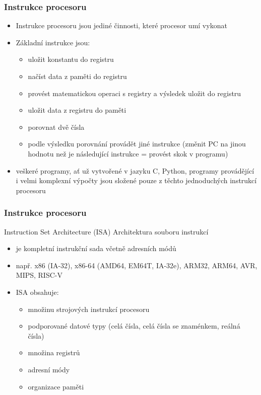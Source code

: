 \documentclass{beamer}
\begin{document}
\begin{frame}
\frametitle{Instrukce procesoru}

\begin{itemize}
\item Instrukce procesoru jsou jediné činnosti, které procesor umí vykonat
\item Základní instrukce jsou:
\begin{itemize}
\item uložit konstantu do registru
\item načíst data z paměti do registru
\item provést matematickou operaci s registry a výsledek uložit do registru
\item uložit data z registru do paměti
\item porovnat dvě čísla
\item podle výsledku porovnání provádět jiné instrukce (změnit PC na jinou hodnotu než je následující instrukce = provést skok v programu)
\end{itemize}
\item veškeré programy, ať už vytvořené v jazyku C, Python, programy provádějící i velmi komplexní výpočty jsou složené pouze z těchto jednoduchých instrukcí procesoru
\end{itemize}

\end{frame}

\begin{frame}
\frametitle{Instrukce procesoru}

Instruction Set Architecture (ISA) Architektura souboru instrukcí
\begin{itemize}
\item je kompletní instrukční sada včetně adresních módů
\item např. x86 (IA-32), x86-64 (AMD64, EM64T, IA-32e), ARM32, ARM64, AVR, MIPS, RISC-V
\item ISA obsahuje:
\begin{itemize}
\item množinu strojových instrukcí procesoru
\item podporované datové typy (celá čísla, celá čísla se znaménkem, reálná čísla)
\item množina registrů
\item adresní módy
\item organizace paměti
\end{itemize}
\end{itemize}

\end{frame}
\end{document}
